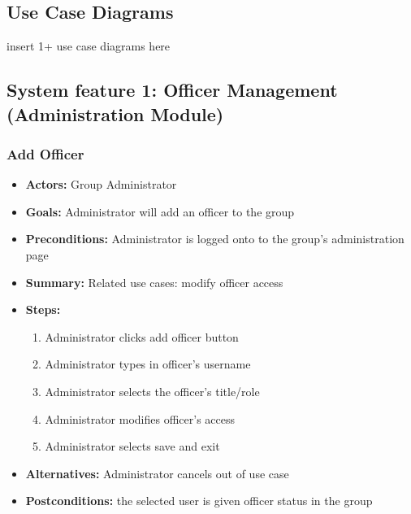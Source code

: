 		\subsection{Use Case Diagrams}
		insert 1+ use case diagrams here
		\subsection{System feature 1: Officer Management (Administration
			Module)}
			\subsubsection{Add Officer}
			\begin{itemize}
				\item{\textbf{Actors:} Group Administrator}
				\item{\textbf{Goals:} Administrator will add an officer
					to the group}
				\item{\textbf{Preconditions:} Administrator is logged onto
					to the group's administration page}
				\item{\textbf{Summary:} Related use cases: modify officer
					access}
				\item{\textbf{Steps:}
				\begin{enumerate}
					\item{Administrator clicks add officer button}
					\item{Administrator types in officer's username}
					\item{Administrator selects the officer's title/role}
					\item{Administrator modifies officer's access}
					\item{Administrator selects save and exit}
				\end{enumerate}
				}
				\item{\textbf{Alternatives:} Administrator cancels out of
					use case}
				\item{\textbf{Postconditions:} the selected user is given
					officer status in the group}
			\end{itemize}
